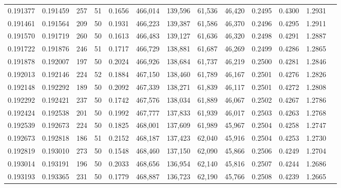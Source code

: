 \begin{tabular}{rrrrrrrrrrrrr}
0.191377 & 0.191459 &   257 &  51 &                                     0.1656 & 466,014 & 139,596 &  61,536 &  46,420 & 0.2495 & 0.4300 & 1.2931 \\
0.191461 & 0.191564 &   209 &  50 &                                     0.1931 & 466,223 & 139,387 &  61,586 &  46,370 & 0.2496 & 0.4295 & 1.2911 \\
0.191570 & 0.191719 &   260 &  50 &                                     0.1613 & 466,483 & 139,127 &  61,636 &  46,320 & 0.2498 & 0.4291 & 1.2887 \\
0.191722 & 0.191876 &   246 &  51 &                                     0.1717 & 466,729 & 138,881 &  61,687 &  46,269 & 0.2499 & 0.4286 & 1.2865 \\
0.191878 & 0.192007 &   197 &  50 &                                     0.2024 & 466,926 & 138,684 &  61,737 &  46,219 & 0.2500 & 0.4281 & 1.2846 \\
0.192013 & 0.192146 &   224 &  52 &                                     0.1884 & 467,150 & 138,460 &  61,789 &  46,167 & 0.2501 & 0.4276 & 1.2826 \\
0.192148 & 0.192292 &   189 &  50 &                                     0.2092 & 467,339 & 138,271 &  61,839 &  46,117 & 0.2501 & 0.4272 & 1.2808 \\
0.192292 & 0.192421 &   237 &  50 &                                     0.1742 & 467,576 & 138,034 &  61,889 &  46,067 & 0.2502 & 0.4267 & 1.2786 \\
0.192424 & 0.192538 &   201 &  50 &                                     0.1992 & 467,777 & 137,833 &  61,939 &  46,017 & 0.2503 & 0.4263 & 1.2768 \\
0.192539 & 0.192673 &   224 &  50 &                                     0.1825 & 468,001 & 137,609 &  61,989 &  45,967 & 0.2504 & 0.4258 & 1.2747 \\
0.192673 & 0.192818 &   186 &  51 &                                     0.2152 & 468,187 & 137,423 &  62,040 &  45,916 & 0.2504 & 0.4253 & 1.2730 \\
0.192819 & 0.193010 &   273 &  50 &                                     0.1548 & 468,460 & 137,150 &  62,090 &  45,866 & 0.2506 & 0.4249 & 1.2704 \\
0.193014 & 0.193191 &   196 &  50 &                                     0.2033 & 468,656 & 136,954 &  62,140 &  45,816 & 0.2507 & 0.4244 & 1.2686 \\
0.193193 & 0.193365 &   231 &  50 &                                     0.1779 & 468,887 & 136,723 &  62,190 &  45,766 & 0.2508 & 0.4239 & 1.2665 \\

\end{tabular}
